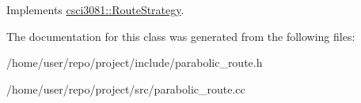 Implements \hyperlink{classcsci3081_1_1RouteStrategy_a4bf67b185a4446324ebc13c1cda40cfe}{csci3081\+::\+Route\+Strategy}.



The documentation for this class was generated from the following files\+:\begin{DoxyCompactItemize}
\item 
/home/user/repo/project/include/parabolic\+\_\+route.\+h\item 
/home/user/repo/project/src/parabolic\+\_\+route.\+cc\end{DoxyCompactItemize}
